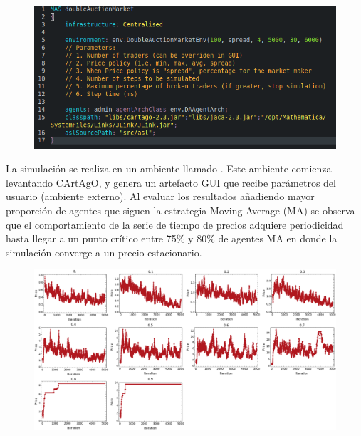 \markdownRendererInterblockSeparator
{}\begin{figure}[h!] \centering \includegraphics[scale=0.4]{img/code.png} \end{figure}\markdownRendererInterblockSeparator
{}\markdownRendererUlBegin
\markdownRendererUlItem La simulación se realiza en un ambiente llamado .\markdownRendererUlItemEnd 
\markdownRendererUlItem Este ambiente comienza levantando CArtAgO, y genera un artefacto GUI que recibe parámetros del usuario (ambiente externo).\markdownRendererUlItemEnd 
\markdownRendererUlEnd \markdownRendererInterblockSeparator
{}\markdownRendererHorizontalRule{}\markdownRendererInterblockSeparator
{}\markdownRendererInterblockSeparator
{}Al evaluar los resultados añadiendo mayor proporción de agentes que siguen la estrategia Moving Average (MA) se observa que el comportamiento de la serie de tiempo de precios adquiere periodicidad hasta llegar a un punto crítico entre 75\% y 80\% de agentes MA en donde la simulación converge a un precio estacionario.\markdownRendererInterblockSeparator
{}\begin{figure}[h!] \centering \includegraphics[scale=0.2]{img/price_series.png} \end{figure}\markdownRendererInterblockSeparator
{}\markdownRendererHorizontalRule{}\relax